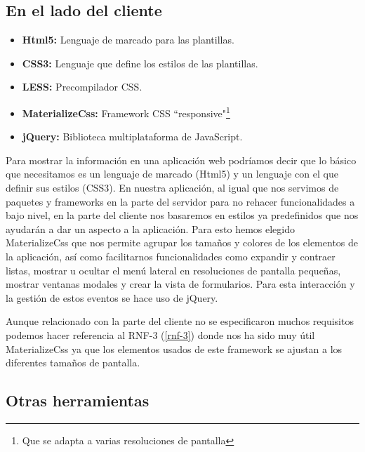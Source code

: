 \subsection{En el lado del cliente}

\begin{itemize}
  \item \textbf{Html5:} Lenguaje de marcado para las plantillas. 
  \item \textbf{CSS3:} Lenguaje que define los estilos de las plantillas.
  \item \textbf{LESS:} Precompilador CSS.
  \item \textbf{MaterializeCss:} Framework CSS ``responsive"\footnote{Que se adapta a varias resoluciones de pantalla}
  \item \textbf{jQuery:} Biblioteca multiplataforma de JavaScript.
\end{itemize}


\bigskip
Para mostrar la información en una aplicación web podríamos decir que lo básico que necesitamos es un lenguaje de marcado (Html5) y un lenguaje con el que definir sus estilos (CSS3). En nuestra aplicación, al igual que nos servimos de paquetes y frameworks en la parte del servidor para no rehacer funcionalidades a bajo nivel, en la parte del cliente nos basaremos en estilos ya predefinidos que nos ayudarán a dar un aspecto a la aplicación. Para esto hemos elegido MaterializeCss que nos permite agrupar los tamaños y colores de los elementos de la aplicación, así como facilitarnos funcionalidades como expandir y contraer listas, mostrar u ocultar el menú lateral en resoluciones de pantalla pequeñas, mostrar ventanas modales y crear la vista de formularios. Para esta interacción y la gestión de estos eventos se hace uso de jQuery.


\bigskip
Aunque relacionado con la parte del cliente no se especificaron muchos requisitos podemos hacer referencia al RNF-3 (\ref{rnf-3}) donde nos ha sido muy útil MaterializeCss ya que los elementos usados de este framework se ajustan a los diferentes tamaños de pantalla.



\subsection{Otras herramientas}

